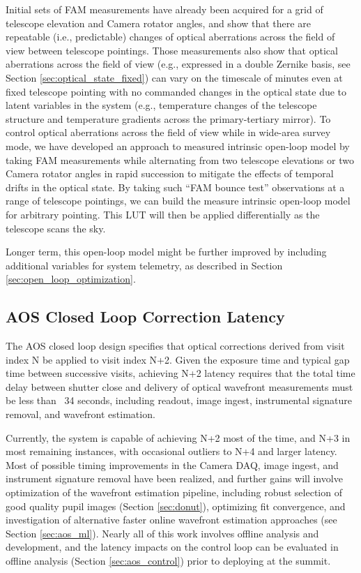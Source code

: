 \documentclass[SO,lsst,authoryear,toc]{lsstdoc}
\begin{document}
Initial sets of FAM measurements have already been acquired for a grid of telescope elevation and Camera rotator angles, and show that there are repeatable (i.e., predictable) changes of optical aberrations across the field of view between telescope pointings.
Those measurements also show that optical aberrations across the field of view (e.g., expressed in a double Zernike basis, see Section \ref{sec:optical_state_fixed}) can vary on the timescale of minutes even at fixed telescope pointing with no commanded changes in the optical state due to latent variables in the system (e.g., temperature changes of the telescope structure and temperature gradients across the primary-tertiary mirror).
To control optical aberrations across the field of view while in wide-area survey mode, we have developed an approach to measured intrinsic open-loop model by taking FAM measurements while alternating from two telescope elevations or two Camera rotator angles in rapid succession to mitigate the effects of temporal drifts in the optical state. By taking such ``FAM bounce test'' observations at a range of telescope pointings, we can build the measure intrinsic open-loop model for arbitrary pointing. This LUT will then be applied differentially as the telescope scans the sky.

Longer term, this open-loop model might be further improved by including additional variables for system telemetry, as described in Section \ref{sec:open_loop_optimization}.

\subsection{AOS Closed Loop Correction Latency}
\label{sec:aos_latency}

The AOS closed loop design specifies that optical corrections derived from visit index N be applied to visit index N+2. Given the exposure time and typical gap time between successive visits, achieving N+2 latency requires that the total time delay between shutter close and delivery of optical wavefront measurements must be less than ~34 seconds, including readout, image ingest, instrumental signature removal, and wavefront estimation.

Currently, the system is capable of achieving N+2 most of the time, and N+3 in most remaining instances, with occasional outliers to N+4 and larger latency.
Most of possible timing improvements in the Camera DAQ, image ingest, and instrument signature removal have been realized, and further gains will involve optimization of the wavefront estimation pipeline, including robust selection of good quality pupil images (Section \ref{sec:donut}), optimizing fit convergence, and investigation of alternative faster online wavefront estimation approaches (see Section \ref{sec:aos_ml}).
Nearly all of this work involves offline analysis and development, and the latency impacts on the control loop can be evaluated in offline analysis (Section \ref{sec:aos_control}) prior to deploying at the summit.
\end{document}
